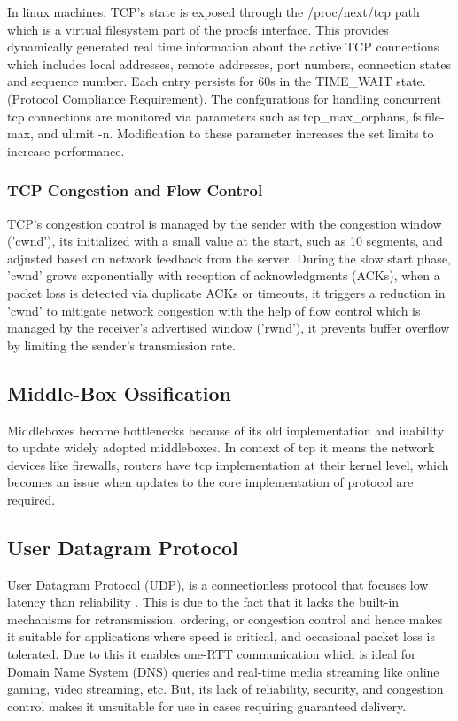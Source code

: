 In linux machines, TCP's state is exposed  through the /proc/next/tcp path which is a virtual filesystem part of the procfs interface. This provides dynamically generated real time information about the active TCP connections which includes local addresses, remote addresses, port numbers, connection states and sequence number. Each entry persists for 60s  in the TIME\_WAIT state. (Protocol Compliance Requirement). The confgurations for handling concurrent tcp connections are monitored via parameters such as tcp\_max\_orphans, fs.file-max, and ulimit -n. Modification to these parameter increases the set limits to increase performance. 


\subsubsection{TCP Congestion and Flow Control}

TCP’s congestion control is managed by the sender with the congestion window ('cwnd'), its initialized with a small value at the start, such as 10 segments, and adjusted based on network feedback from the server. During the slow start phase, 'cwnd' grows exponentially with reception of acknowledgments (ACKs), when a packet loss is detected via duplicate ACKs or timeouts, it triggers a reduction in 'cwnd' to mitigate network congestion with the help of flow control which is managed by the receiver’s advertised window ('rwnd'), it prevents buffer overflow by limiting the sender’s transmission rate.





\subsection{Middle-Box Ossification}
Middleboxes become bottlenecks because of its old implementation and inability to update widely adopted middleboxes. In context of tcp it means the network devices like firewalls, routers have tcp implementation at their kernel level, which becomes an issue when updates to the core implementation of protocol are required.


\subsection{User Datagram Protocol}

User Datagram Protocol (UDP), is a connectionless protocol that focuses low latency than reliability \cite{kurose2017}. This is due to the fact that it lacks the built-in mechanisms for retransmission, ordering, or congestion control and hence makes it suitable for applications where speed is critical, and occasional packet loss is tolerated. Due to this it enables one-RTT communication which is ideal for Domain Name System (DNS) queries and real-time media streaming like online gaming, video streaming, etc. But, its lack of reliability, security, and congestion control makes it unsuitable for use in cases requiring guaranteed delivery.


